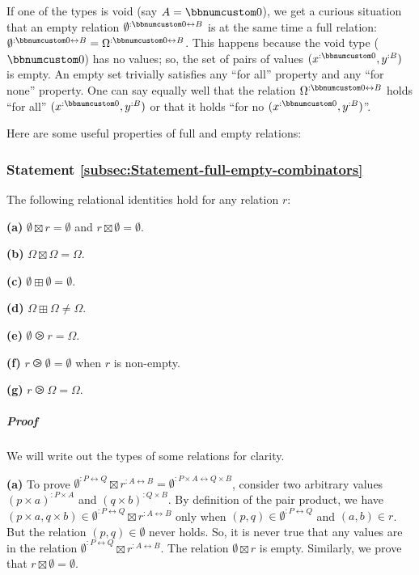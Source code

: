 If one of the types is void (say $A=\bbnum 0$), we get a curious
situation that an empty relation $\emptyset^{:\bbnum 0\leftrightarrow B}$
is at the same time a full relation: $\emptyset^{:\bbnum 0\leftrightarrow B}=\Omega^{:\bbnum 0\leftrightarrow B}$.
This happens because the void type ($\bbnum 0$) has no values; so,
the set of pairs of values $(x^{:\bbnum 0},y^{:B})$ is empty. An
empty set trivially satisfies any \textsf{``}for all\textsf{''} property and any \textsf{``}for
none\textsf{''} property. One can say equally well that the relation $\Omega^{:\bbnum 0\leftrightarrow B}$
holds \textsf{``}for all\textsf{''} $(x^{:\bbnum 0},y^{:B})$ or that it holds \textsf{``}for
no $(x^{:\bbnum 0},y^{:B})$\textsf{''}. 

Here are some useful properties of full and empty relations:

\subsubsection{Statement \label{subsec:Statement-full-empty-combinators}\ref{subsec:Statement-full-empty-combinators}}

The following relational identities hold for any relation $r$:

\textbf{(a)} $\emptyset\boxtimes r=\emptyset$ and $r\boxtimes\emptyset=\emptyset$.

\textbf{(b)} $\Omega\boxtimes\Omega=\Omega$.

\textbf{(c)} $\emptyset\boxplus\emptyset=\emptyset$.

\textbf{(d)} $\Omega\boxplus\Omega\neq\Omega$.

\textbf{(e)} $\emptyset\ogreaterthan r=\Omega$.

\textbf{(f)} $r\ogreaterthan\emptyset=\emptyset$ when $r$ is non-empty.

\textbf{(g)} $r\ogreaterthan\Omega=\Omega$.

\subparagraph{Proof}

We will write out the types of some relations for clarity.

\textbf{(a)} To prove $\emptyset^{:P\leftrightarrow Q}\boxtimes r^{:A\leftrightarrow B}=\emptyset^{:P\times A\leftrightarrow Q\times B}$,
consider two arbitrary values $(p\times a)^{:P\times A}$ and $(q\times b)^{:Q\times B}$.
By definition of the pair product, we have $(p\times a,q\times b)\in\emptyset^{:P\leftrightarrow Q}\boxtimes r^{:A\leftrightarrow B}$
only when $(p,q)\in\emptyset^{:P\leftrightarrow Q}$ and $(a,b)\in r$.
But the relation $(p,q)\in\emptyset$ never holds. So, it is never
true that any values are in the relation $\emptyset^{:P\leftrightarrow Q}\boxtimes r^{:A\leftrightarrow B}$.
The relation $\emptyset\boxtimes r$ is empty. Similarly, we prove
that $r\boxtimes\emptyset=\emptyset$.

